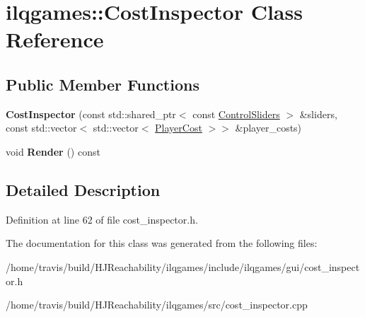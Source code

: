 \hypertarget{classilqgames_1_1_cost_inspector}{}\section{ilqgames\+:\+:Cost\+Inspector Class Reference}
\label{classilqgames_1_1_cost_inspector}
\subsection*{Public Member Functions}
\begin{DoxyCompactItemize}
\item 
{\bfseries Cost\+Inspector} (const std\+::shared\+\_\+ptr$<$ const \hyperlink{classilqgames_1_1_control_sliders}{Control\+Sliders} $>$ \&sliders, const std\+::vector$<$ std\+::vector$<$ \hyperlink{classilqgames_1_1_player_cost}{Player\+Cost} $>$$>$ \&player\+\_\+costs)\hypertarget{classilqgames_1_1_cost_inspector_a40b12f9b1646636615d5e0f00ebd0814}{}\label{classilqgames_1_1_cost_inspector_a40b12f9b1646636615d5e0f00ebd0814}

\item 
void {\bfseries Render} () const \hypertarget{classilqgames_1_1_cost_inspector_af6ccfb7db9e5672ee1798019b6aac177}{}\label{classilqgames_1_1_cost_inspector_af6ccfb7db9e5672ee1798019b6aac177}

\end{DoxyCompactItemize}


\subsection{Detailed Description}


Definition at line 62 of file cost\+\_\+inspector.\+h.



The documentation for this class was generated from the following files\+:\begin{DoxyCompactItemize}
\item 
/home/travis/build/\+H\+J\+Reachability/ilqgames/include/ilqgames/gui/cost\+\_\+inspector.\+h\item 
/home/travis/build/\+H\+J\+Reachability/ilqgames/src/cost\+\_\+inspector.\+cpp\end{DoxyCompactItemize}

